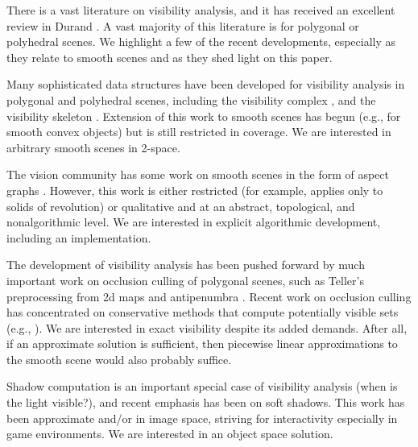 \documentclass[10pt,twocolumn]{article}
\begin{document}
There is a vast literature on visibility analysis, and it has received an excellent
review in Durand \cite{durand00a}.
A vast majority of this literature is for polygonal or polyhedral scenes.
We highlight a few of the recent developments,
especially as they relate to smooth scenes and as they shed light on this paper.

Many sophisticated data structures have been developed for visibility analysis in
polygonal and polyhedral scenes, including 
the visibility complex \cite{pocchiola96,durand96,durand97b}, %
and the visibility skeleton \cite{durand97a}.
Extension of this work to smooth scenes has begun
(e.g., \cite{durand97b} for smooth convex objects) but is still restricted in coverage.
We are interested in arbitrary smooth scenes in 2-space.

The vision community has some work on smooth scenes in the form of aspect graphs
\cite{koenderink76,ponce90,chen91,petitjean92,eggert93}.
However, this work is either restricted 
(for example, \cite{eggert93} applies only to solids of revolution) 
or qualitative and at an abstract, topological, and nonalgorithmic level.
We are interested in explicit algorithmic development, including an implementation.

The development of visibility analysis has been pushed forward by 
much important work on occlusion culling of polygonal scenes, such as Teller's 
preprocessing from 2d maps \cite{teller91} and antipenumbra \cite{teller92}.
Recent work on occlusion culling has concentrated on conservative methods
that compute potentially visible sets (e.g., \cite{durand00b, leyvand03}).
We are interested in exact visibility 
despite its added demands. %
After all, if an approximate solution is sufficient,
then piecewise linear approximations to the smooth scene would also probably suffice.

Shadow computation is an important special case of visibility analysis 
(when is the light visible?),
and recent emphasis has been on soft shadows.
This work has been approximate and/or in image space, striving for interactivity 
especially in game environments.%
We are interested in an object space solution.
\end{document}
